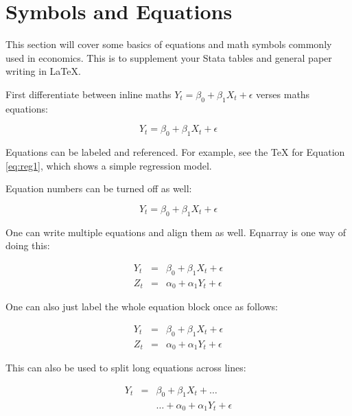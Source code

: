 \documentclass[11pt]{article}
\numberwithin{table}{section}   %
\begin{document}

\clearpage

\section{Symbols and Equations} \label{sec:equations}

This section will cover some basics of equations and math symbols commonly used in economics. This is to supplement your Stata tables and general paper writing in \LaTeX.


First differentiate between inline maths $Y_t = \beta_0 + \beta_1 X_t + \epsilon$ verses maths equations:

\begin{equation}
    Y_t = \beta_0 + \beta_1 X_t + \epsilon  \label{eq:reg1}
\end{equation}

Equations can be labeled and referenced. For example, see the TeX for Equation \ref{eq:reg1}, which shows a simple regression model.

Equation numbers can be turned off as well:

\begin{equation}
    Y_t = \beta_0 + \beta_1 X_t + \epsilon \nonumber
\end{equation}

One can write multiple equations and align them as well. Eqnarray is one way of doing this:

\begin{eqnarray}
    Y_t &=& \beta_0 + \beta_1 X_t + \epsilon \\ 
    Z_t &=& \alpha_0 + \alpha_1 Y_t + \epsilon 
\end{eqnarray}

One can also just label the whole equation block once as follows: 

\begin{eqnarray}
    Y_t &=& \beta_0 + \beta_1 X_t + \epsilon \\  \nonumber
    Z_t &=& \alpha_0 + \alpha_1 Y_t + \epsilon 
\end{eqnarray}

This can also be used to split long equations across lines:

\begin{eqnarray}
    Y_t &=& \beta_0 + \beta_1 X_t + \dots  \\  \nonumber
        && \dots + \alpha_0 + \alpha_1 Y_t + \epsilon 
\end{eqnarray}
\end{document}
